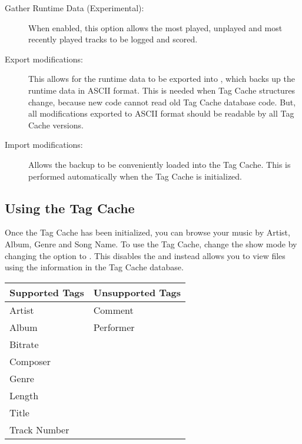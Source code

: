 \begin{description}
		\item[Gather Runtime Data (Experimental):  ]
		When enabled, this option allows the most played, unplayed and most recently
		played tracks to be logged and scored.

		\item[Export modifications:  ]
		This allows for the runtime data to be exported into 
		, which backs up the runtime data in
		ASCII format. This is needed when Tag Cache structures change, because new 
		code cannot read old Tag Cache database code.  But, all modifications 
		exported to ASCII format should be readable by all Tag Cache versions.

		\item[Import modifications:  ]
		Allows the  backup to be 
		conveniently loaded into the Tag Cache. This is performed automatically when
		the Tag Cache is initialized.
	
	\end{description}

\subsection{Using the Tag Cache}
Once the Tag Cache has been initialized, you can browse your music by Artist, 
Album, Genre and Song Name.  To use the Tag Cache, change the 
 show mode by changing the  option to 
.  This disables the  and instead
allows you to view files using the information in the Tag Cache database.\\

%
\begin{table}
\begin{center}
  \begin{tabularx}{.75\textwidth}{XX}
  \toprule
  Supported Tags   & Unsupported Tags \\ 
  \midrule
  Artist           & Comment \\
  Album            & Performer\\
  Bitrate          & \\
  Composer         & \\
  Genre            & \\
  Length           & \\
  Title            & \\
  Track Number     & \\
  \bottomrule
  \end{tabularx}
\end{center}
\end{table}

